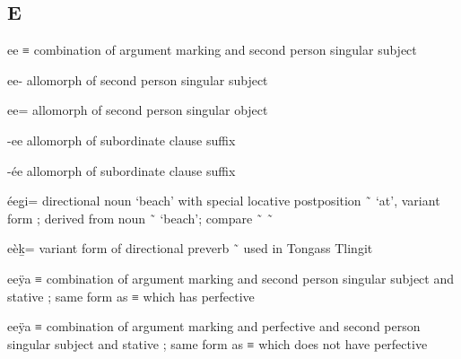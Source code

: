 
\subsection{E}\label{sec:alphalist-e}
\begin{morphdesc}[resume*=alphalist]
\item[ee]\label{m:ee}
	≡ 
	combination of argument marking 
		and second person singular subject 

\item[ee-]
	allomorph of second person singular subject 

\item[ee=]
	allomorph of second person singular object 

\item[-ee]\label{m:-ee-sub}
	allomorph of subordinate clause suffix 

\item[-ée]\label{m:-ée-sub}
	allomorph of subordinate clause suffix 

\item[éeg̱i=]\label{m:éeg̱i=}
	directional noun ‘beach’ with special locative postposition  \~\  ‘at’,
	variant form ;
	derived from noun  \~\  ‘beach’;
	compare  \~\  \~\ 

\item[eèḵ=]\label{m:eeḵ=}
	variant form of directional preverb  \~\  used in Tongass Tlingit

\item[eeÿa]\label{m:eeÿa-a-i-ÿa}
	≡ 
	combination of argument marking 
		and second person singular subject 
		and stative ;
	same form as  ≡ 
		which has perfective 

\item[eeÿa]\label{m:eeÿa-a-ʷ-i-ÿa}
	≡ 
	combination of argument marking 
		and perfective 
		and second person singular subject 
		and stative ;
	same form as  ≡ 
		which does not have perfective 


\end{morphdesc}
